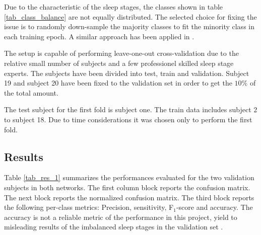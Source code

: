 Due to the characteristic of the sleep stages, the classes shown in table \ref{tab_class_balance} are not equally distributed. The selected choice for fixing the issue is to randomly down-sample the majority classes to fit the minority class in each training epoch. A similar approach has been applied in \cite{main_ar}. 

The setup is capable of performing leave-one-out cross-validation due to the relative small number of subjects and a few professionel skilled sleep stage experts.
The subjects have been divided into test, train and validation. Subject 19 and subject 20 have been fixed to the validation set in order to get the $10\%$ of the total amount. 

The test subject for the first fold is subject one. The train data includes subject 2 to subject 18. Due to time considerations it was chosen only to perform the first fold.

\subsection{Results}
\label{subsec:results}

Table \ref{tab_res_1} summarizes the performances evaluated for the two validation subjects in both networks. 
The first column block reports the confusion matrix. The next block reports the normalized confusion matrix. The third block reports the following per-class metrics: Precision, sensitivity, F$_1$-score and accuracy. The accuracy is not a reliable metric of the performance in this project, yield to misleading results of the imbalanced sleep stages in the validation set \cite[sec. 11]{dl_book}.

